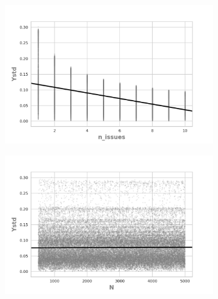 
\begin{figure}[H]
    \centering
    \begin{subfigure}[b]{0.49\textwidth}
        \includegraphics[width=\textwidth]{ims/sigmaregression/sigmaissues.png}
    \end{subfigure}
    \begin{subfigure}[b]{0.49\textwidth}
        \includegraphics[width=\textwidth]{ims/sigmaregression/sigmaN.png}
    \end{subfigure}


\end{figure}
